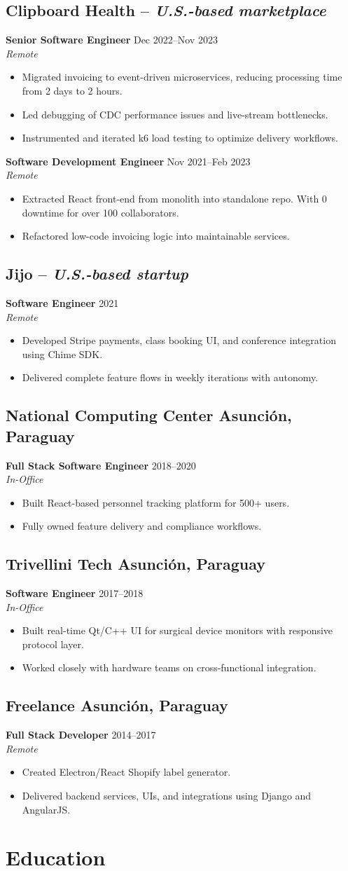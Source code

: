 \documentclass[11pt,a4paper]{article}
\newcommand{\cvcompany}[3]{
  \subsection{#1 \textcolor{mediumgray}{#2}}
  #3
  \vspace{0.5em}
}
\newcommand{\cvrole}[4]{
  \textbf{#1} \hfill \textcolor{mediumgray}{\small #2}\\
  \textit{#3}
  \begin{itemize}
    #4
  \end{itemize}
  \vspace{0.4em}
}
\begin{document}
\cvcompany{Clipboard Health}{-- \textit{U.S.-based marketplace}}{
  \cvrole{Senior Software Engineer}{Dec 2022--Nov 2023}{Remote}{
    \item Migrated invoicing to event-driven microservices, reducing processing time from 2 days to 2 hours.
    \item Led debugging of CDC performance issues and live-stream bottlenecks.
    \item Instrumented and iterated k6 load testing to optimize delivery workflows.
  }
  
  \cvrole{Software Development Engineer}{Nov 2021--Feb 2023}{Remote}{
    \item Extracted React front-end from monolith into standalone repo. With 0 downtime for over 100 collaborators.
    \item Refactored low-code invoicing logic into maintainable services.
  }
}

\cvcompany{Jijo}{-- \textit{U.S.-based startup}}{
  \cvrole{Software Engineer}{2021}{Remote}{
    \item Developed Stripe payments, class booking UI, and conference integration using Chime SDK.
    \item Delivered complete feature flows in weekly iterations with autonomy.
  }
}

\cvcompany{National Computing Center}{Asunción, Paraguay}{
  \cvrole{Full Stack Software Engineer}{2018--2020}{In-Office}{
    \item Built React-based personnel tracking platform for 500+ users.
    \item Fully owned feature delivery and compliance workflows.
  }
}

\cvcompany{Trivellini Tech}{Asunción, Paraguay}{
  \cvrole{Software Engineer}{2017--2018}{In-Office}{
    \item Built real-time Qt/C++ UI for surgical device monitors with responsive protocol layer.
    \item Worked closely with hardware teams on cross-functional integration.
  }
}

\cvcompany{Freelance}{Asunción, Paraguay}{
  \cvrole{Full Stack Developer}{2014--2017}{Remote}{
    \item Created Electron/React Shopify label generator.
    \item Delivered backend services, UIs, and integrations using Django and AngularJS.
  }
}

\section{Education}
\end{document}
